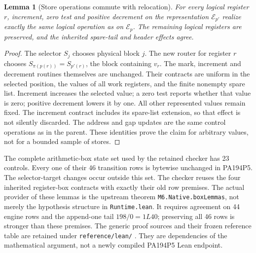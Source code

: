 \documentclass[11pt,letterpaper]{article}
\newcommand{\file}[1]{\texttt{\nolinkurl{#1}}}
\newtheorem{lemma}[theorem]{Lemma}
\begin{document}
\begin{lemma}[Store operations commute with relocation]
For every logical register $r$, increment, zero test and positive
decrement on the representation $\mathcal E_{p'}$ realize exactly
the same logical operation as on $\mathcal E_p$. The remaining
logical registers are preserved, and the inherited spare-tail and
header effects agree.
\end{lemma}
\begin{proof}
The selector $S_j$ chooses physical block $j$. The new router for
register $r$ chooses $S_{\pi(p(r))}=S_{p'(r)}$, the block containing
$v_r$. The mark, increment and decrement routines themselves are
unchanged. Their contracts are uniform in the selected position,
the values of all work registers, and the finite nonempty spare
list. Increment increases the selected value; a zero test reports
whether that value is zero; positive decrement lowers it by one.
All other represented values remain fixed. The increment contract
includes its spare-list extension, so that effect is not silently
discarded. The address and gap updates are the same control
operations as in the parent. These identities prove the claim for
arbitrary values, not for a bounded sample of stores.
\end{proof}

The complete arithmetic-box state set used by the retained checker
has 23 controls. Every one of their 46 transition rows is bytewise
unchanged in PA194P5. The selector-target changes occur outside
this set. The checker reuses the four inherited register-box
contracts with exactly their old row premises. The actual provider of
these lemmas is the upstream theorem \file{M6.Native.boxLemmas}, not
merely the hypothesis structure in \file{Runtime.lean}. It requires
agreement on 44 engine rows and the append-one tail
$198/0=1L40$; preserving all 46 rows is stronger than these premises.
The generic proof sources and their frozen reference table are retained
under \file{reference/lean/} \cite{boxlemmas}. They are dependencies of
the mathematical argument, not a newly compiled PA194P5 Lean endpoint.
\end{document}
